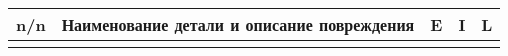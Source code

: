 \setcounter{rownum}{0}
\begin{longtable}{G{3mm}|M{130mm}|G{5mm}|G{5mm}|G{5mm}}
     \hline %
    \hline
    \toprule 
    \bf  {\footnotesize  n/n}  &\bf {\small Наименование  детали и описание повреждения} & \bf {\small E} & \bf {\small I}& \bf {\small L}\\\hline\hline   \toprule  \endhead 
   

  \end{longtable}\setcounter{rownum}{0}